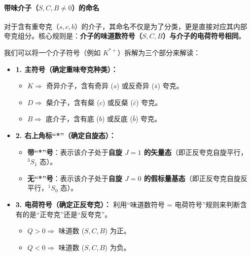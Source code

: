 \paragraph{带味介子（$S, C, B \neq 0$）的命名}
对于含有重夸克（$s, c, b$）的介子，其命名不仅是为了分类，更是直接对应其内部夸克组分。核心规则是：\textbf{介子的味道数符号（$S, C, B$）与介子的电荷符号相同}。

我们可以将一个介子符号（例如 $K^{*+}$）拆解为三个部分来解读：

\begin{itemize}
    \item \textbf{1. 主符号（确定重味夸克种类）：}
    \begin{itemize}
        \item $K \Rightarrow$ 奇异介子，含有奇异 ($s$) 或反奇异 ($\bar{s}$) 夸克。
        \item $D \Rightarrow$ 粲介子，含有粲 ($c$) 或反粲 ($\bar{c}$) 夸克。
        \item $B \Rightarrow$ 底介子，含有底 ($b$) 或反底 ($\bar{b}$) 夸克。
    \end{itemize}
    
    \item \textbf{2. 右上角标“*”（确定自旋态）：}
    \begin{itemize}
        \item \textbf{带“*”号}：表示该介子处于\textbf{自旋 $J=1$ 的矢量态}（即正反夸克自旋平行，${}^3S_1$ 态）。
        \item \textbf{无“*”号}：表示该介子处于\textbf{自旋 $J=0$ 的假标量基态}（即正反夸克自旋反平行，${}^1S_0$ 态）。
    \end{itemize}

    \item \textbf{3. 电荷符号（确定正反夸克）：}
    利用“味道数符号 = 电荷符号”规则来判断含有的是“正夸克”还是“反夸克”。
    \begin{itemize}
        \item $Q > 0 \Rightarrow$ 味道数 ($S, C, B$) 为正。
        \item $Q < 0 \Rightarrow$ 味道数 ($S, C, B$) 为负。
    \end{itemize}
\end{itemize}

